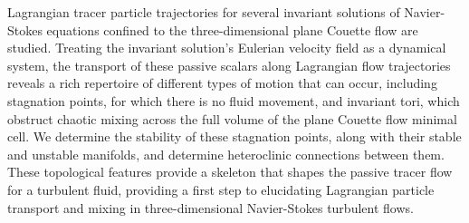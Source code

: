 


Lagrangian tracer particle trajectories for several invariant solutions 
of Navier-Stokes equations confined to the three-dimensional plane 
Couette flow are studied. Treating the invariant solution's Eulerian 
velocity field as a dynamical system, the transport of these passive 
scalars along Lagrangian flow trajectories reveals a rich repertoire of 
different types of motion that can occur, including stagnation points, 
for which there is no fluid movement, and invariant tori, which obstruct 
chaotic mixing across the full volume of the plane Couette flow minimal 
cell. We determine the stability of these stagnation points, along with 
their stable and unstable manifolds, and determine heteroclinic 
connections between them. These topological features provide a skeleton 
that shapes the passive tracer flow for a turbulent fluid, providing a 
first step to elucidating Lagrangian particle transport and mixing in 
three-dimensional Navier-Stokes turbulent flows. 

